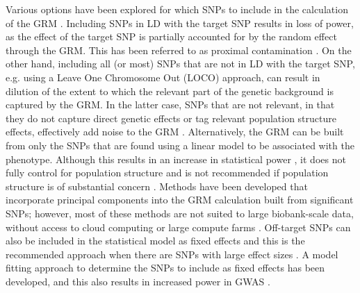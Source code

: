 \documentclass[fleqn,10pt]{wlscirep}
\begin{document}
Various options have been explored for which SNPs to include in the calculation of the GRM \cite{yang2014advantages}. Including SNPs in LD with the target SNP results in loss of power, as the effect of the target SNP is partially accounted for by the random effect through the GRM. This has been referred to as proximal contamination \cite{listgarten2012improved}. On the other hand, including all (or most) SNPs that are not in LD with the target SNP, e.g. using a Leave One Chromosome Out (LOCO) approach, can result in dilution of the extent to which the relevant part of the genetic background is captured by the GRM. In the latter case, SNPs that are not relevant, in that they do not capture direct genetic effects or tag relevant population structure effects, effectively add noise to the GRM \cite{listgarten2012improved}. Alternatively, the GRM can be built from only the SNPs that are found using a linear model to be associated with the phenotype. Although this results in an increase in statistical power \cite{fastlmm,yang2014advantages,lippert2013benefits}, it does not fully control for population structure and is not recommended if population structure is of substantial concern \cite{BOLT,yang2014advantages}. Methods have been developed that incorporate principal components into the GRM calculation built from significant SNPs; however, most of these methods are not suited to large biobank-scale data, without access to cloud computing or large compute farms \cite{tucker2014improving,canela2018atlas,kadie2019ludicrous}. Off-target SNPs can also be included in the statistical model as fixed effects and this is the recommended approach when there are SNPs with large effect sizes \cite{yang2014advantages}. A model fitting approach to determine the SNPs to include as fixed effects has been developed, and this also results in increased power in GWAS \cite{listgarten2012improved}.  

\par\par
\end{document}
